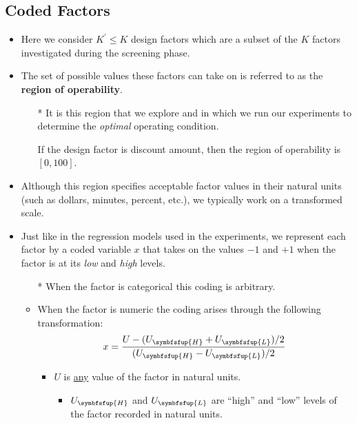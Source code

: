 \subsection*{Coded Factors}
\begin{itemize}
      \item Here we consider $ K^\prime\le K $ design factors which are a subset of the $K$ factors investigated during the
            screening phase.
      \item The set of possible values these factors can take on is referred to as the \textbf{region of operability}.
            \begin{itemize}
                  \item[*] It is this region that we explore and in which we run our experiments to determine the \emph{optimal}
                        operating condition.
                        \begin{Example}{}{}
                              If the design factor is discount amount, then the region of operability is $ [0,100] $.
                        \end{Example}
            \end{itemize}
      \item Although this region specifies acceptable factor values in their natural units (such as dollars, minutes,
            percent, etc.), we typically work on a transformed scale.
      \item Just like in the regression models used in the experiments, we represent each factor by a coded variable
            $x$ that takes on the values $-1$ and $+1$ when the factor is at its \emph{low} and \emph{high} levels.
            \begin{itemize}
                  \item[*] When the factor is categorical this coding is arbitrary.
                  \item When the factor is numeric the coding arises through the following transformation:
                        \[ x=\frac{U-(U_{\symbfsfup{H}}+U_{\symbfsfup{L}})/2}{(U_{\symbfsfup{H}}-U_{\symbfsfup{L}})/2}  \]
                        \begin{itemize}
                              \item $ U $ is \underline{any} value of the factor in natural units.
                                    \begin{itemize}
                                          \item $ U_{\symbfsfup{H}} $ and $ U_{\symbfsfup{L}} $ are ``high'' and ``low'' levels of the factor recorded in natural units.

\end{itemize}
\end{itemize}
\end{itemize}
\end{itemize}
